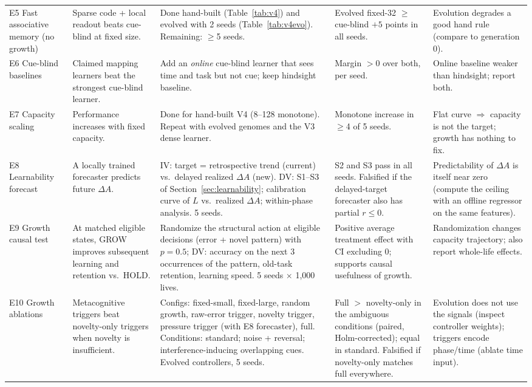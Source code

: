 \documentclass[11pt]{article}
\theoremstyle{remark}
\begin{document}
\begin{longtable}{>{\raggedright\arraybackslash}p{1.6cm}>{\raggedright\arraybackslash}p{3.0cm}>{\raggedright\arraybackslash}p{3.1cm}>{\raggedright\arraybackslash}p{3.3cm}>{\raggedright\arraybackslash}p{3.8cm}}
E5 Fast associative memory (no growth) & Sparse code + local readout beats cue-blind at fixed size. & Done hand-built (Table~\ref{tab:v4}) and evolved with 2 seeds (Table~\ref{tab:v4evo}). Remaining: $\ge$5 seeds. & Evolved fixed-32 $\ge$ cue-blind $+5$ points in all seeds. & Evolution degrades a good hand rule (compare to generation 0). \\
E6 Cue-blind baselines & Claimed mapping learners beat the strongest cue-blind learner. & Add an \emph{online} cue-blind learner that sees time and task but not cue; keep hindsight baseline. & Margin $>0$ over both, per seed. & Online baseline weaker than hindsight; report both. \\
E7 Capacity scaling & Performance increases with fixed capacity. & Done for hand-built V4 (8--128 monotone). Repeat with evolved genomes and the V3 dense learner. & Monotone increase in $\ge$4 of 5 seeds. & Flat curve $\Rightarrow$ capacity is not the target; growth has nothing to fix. \\
E8 Learnability forecast & A locally trained forecaster predicts future $\Delta A$. & IV: target = retrospective trend (current) vs.\ delayed realized $\Delta A$ (new). DV: S1--S3 of Section~\ref{sec:learnability}; calibration curve of $L$ vs.\ realized $\Delta A$; within-phase analysis. 5 seeds. & S2 and S3 pass in all seeds. Falsified if the delayed-target forecaster also has partial $r\le0$. & Predictability of $\Delta A$ is itself near zero (compute the ceiling with an offline regressor on the same features). \\
E9 Growth causal test & At matched eligible states, GROW improves subsequent learning and retention vs.\ HOLD. & Randomize the structural action at eligible decisions (error + novel pattern) with $p=0.5$; DV: accuracy on the next 3 occurrences of the pattern, old-task retention, learning speed. 5 seeds $\times$ 1{,}000 lives. & Positive average treatment effect with CI excluding 0; supports causal usefulness of growth. & Randomization changes capacity trajectory; also report whole-life effects. \\
E10 Growth ablations & Metacognitive triggers beat novelty-only triggers when novelty is insufficient. & Configs: fixed-small, fixed-large, random growth, raw-error trigger, novelty trigger, pressure trigger (with E8 forecaster), full. Conditions: standard; noise + reversal; interference-inducing overlapping cues. Evolved controllers, 5 seeds. & Full $>$ novelty-only in the ambiguous conditions (paired, Holm-corrected); equal in standard. Falsified if novelty-only matches full everywhere. & Evolution does not use the signals (inspect controller weights); triggers encode phase/time (ablate time input). \\
\bottomrule
\end{longtable}
\endgroup
\end{document}
